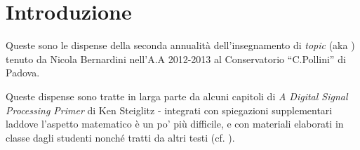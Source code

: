 %
%

\chapter{Introduzione}

Queste sono le dispense della seconda annualit\`a dell'insegnamento di \emph{topic}
(aka \emph{\topicacro}) tenuto da Nicola Bernardini nell'A.A 2012-2013 al
Conservatorio ``C.Pollini'' di Padova.

Queste dispense sono tratte in larga parte da alcuni capitoli di \emph{A Digital Signal Processing Primer}
di Ken Steiglitz\cite{steiglitz:adspp} - integrati
con spiegazioni supplementari laddove l'aspetto matematico \`e un po' pi\`u
difficile,
e con materiali elaborati in
classe dagli studenti
nonch\'e tratti da altri testi
(cf. \cite{steiglitz1974introduction, t1987digital, park2010introduction, shenoi2005introduction}).
